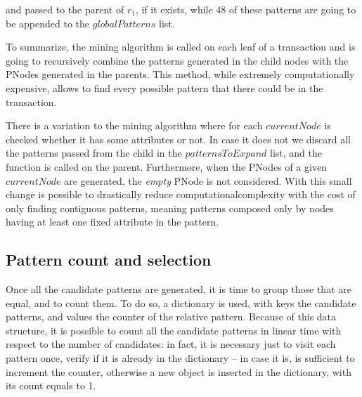 \documentclass{acm_proc_article-sp-sigmod09}
\begin{document}
and passed to the parent of $r_1$, if it exists, while 48 of these patterns are going to be appended to the $globalPatterns$ list.

To summarize, the mining algorithm is called on each leaf of a transaction and is going to recursively combine the patterns generated in the child nodes with the PNodes generated in the parents. This method, while extremely computationally expensive, allows to find every possible pattern that there could be in the transaction.

There is a variation to the mining algorithm where for each $currentNode$ is checked whether it has some attributes or not. In case it does not we discard all the patterns passed from the child in the $patternsToExpand$ list, and the function is called on the parent. Furthermore, when the PNodes of a given $currentNode$ are generated, the \emph{empty} PNode is not considered. With this small change is possible to drastically reduce computationalcomplexity with the cost of only finding contiguous patterns, meaning patterns composed only by nodes having at least one fixed attribute in the pattern.

\subsection{Pattern count and selection}
Once all the candidate patterns are generated, it is time to group those that are equal, and to count them. To do so, a dictionary is used, with keys the candidate patterns, and values the counter of the relative pattern. Because of this data structure, it is possible to count all the candidate patterns in linear time with respect to the number of candidates: in fact, it is necessary just to visit each pattern once, verify if it is already in the dictionary -- in case it is, is sufficient to increment the counter, otherwise a new object is inserted in the dictionary, with its count equals to 1.
\end{document}
